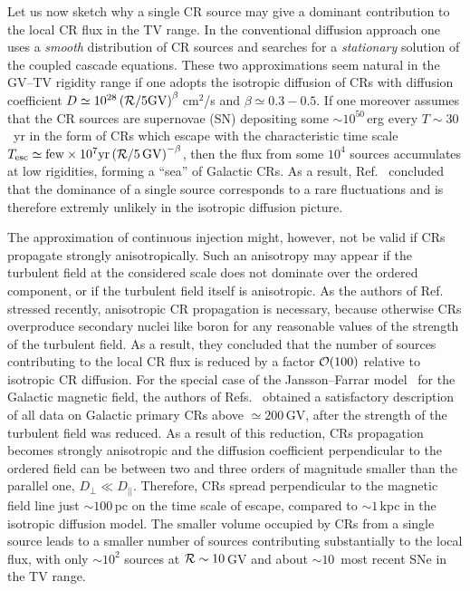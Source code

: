 \documentclass[prd,aps,twocolumn]{revtex4}
\def\R{{\cal R}}
\begin{document}
Let us now sketch why a single CR source may give a dominant
contribution to the local CR flux in the TV range. 
In the conventional diffusion approach one uses a {\em smooth\/} distribution 
of CR sources and searches for a {\em stationary} solution of the coupled 
cascade equations. These two approximations seem natural in the GV--TV 
rigidity range if one adopts the isotropic diffusion of CRs with diffusion 
coefficient $D\simeq 10^{28}\left( \R/5 {\rm GV}\right)^\beta$\,cm$^2$/s and
$\beta\simeq 0.3-0.5$. If one moreover assumes that the CR sources are 
supernovae (SN) depositing  some $\sim 10^{50}$\,erg  every $T\sim 30$~yr 
in the form of CRs which  escape with the characteristic time scale 
$T_{\rm esc}\simeq {\rm few}\times 10^7{\rm yr}\left(\R/5\, {\rm GV}\right)^{-\beta}$, then the flux from some $10^{4}$ sources 
accumulates at low rigidities, forming a ``sea'' of Galactic CRs.
As a result, Ref.~\cite{myriad} concluded that the dominance of a
single source corresponds to a rare fluctuations and is therefore
extremly unlikely in the isotropic diffusion picture.


The approximation of continuous injection might, however, not be valid 
if CRs propagate strongly anisotropically. Such an anisotropy may appear if
the turbulent field at the considered scale does not dominate over the 
ordered component, or if the turbulent field itself is anisotropic.
As the authors of Ref.~\cite{GMF} stressed recently, anisotropic CR
propagation is necessary, because otherwise CRs overproduce
secondary nuclei like boron for any reasonable values of the strength of
the turbulent field. As a result, they concluded that the number of sources
contributing to the local CR flux is reduced by a factor ${\cal O}(100)$
relative to isotropic CR diffusion. For the special case of the
Jansson--Farrar model~\cite{JF} for the Galactic magnetic field, the authors
of Refs.~\cite{GKS14,GKS15} obtained a satisfactory description of all data
on Galactic primary CRs above $\simeq 200$\,GV, after the strength of the
turbulent field was reduced. As a result of this
reduction, CRs propagation becomes strongly anisotropic and the diffusion 
coefficient perpendicular to the ordered field can be between two and three 
orders of magnitude smaller 
than the parallel one, $D_\bot\ll D_{||}$. Therefore, CRs spread perpendicular
to the magnetic field line just $\sim 100$\,pc on the time scale of 
escape, compared to $\sim 1$\,kpc in the isotropic diffusion model. The 
smaller volume occupied by CRs from a single source leads to a smaller number 
of sources contributing substantially to the local flux, with only 
$\sim 10^2$ sources at $\R\sim 10$\,GV and about $\sim 10$~most recent SNe in 
the TV range. 
\end{document}
